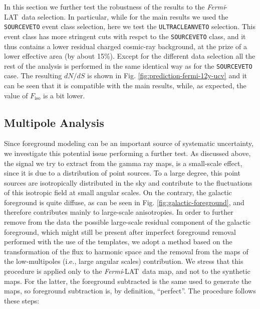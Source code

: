 \documentclass[a4paper,11pt]{article}
\newcommand{\fermi}{\textsl{Fermi}-LAT\ }
\newcommand{\fiso}{{F_\textrm{iso}}}
\newcommand{\dnds}{dN/dS }
\begin{document}
In this section we further test the robustness of the results to the \fermi data selection. In particular, while for the main results we used the \texttt{SOURCEVETO} event class selection, here we test the \texttt{ULTRACLEANVETO} selection. This event class has more stringent cuts with respct to the \texttt{SOURCEVETO} class, and it thus contains a lower residual charged  cosmic-ray background, at the prize of a lower effective area (by about 15\%). Except for the different data selection all the rest of the analysis is performed in the same identical way as for the \texttt{SOURCEVETO} case. The resulting $\dnds$ is shown in Fig. \ref{fig:prediction-fermi-12y-ucv} and it can be seen that it is compatible with the main results, while, as expected, the value of $\fiso$ is a bit lower. 



\subsection{Multipole Analysis}



Since foreground modeling can be an important source of systematic uncertainty,  we investigate this potential issue performing a further test. 
As discussed above, the signal we try to extract from the gamma ray maps, is a small-scale effect, since it is due to a distribution of point sources. To a large degree, this point sources are isotropically distributed in the sky and contribute to the fluctuations of this isotropic field at small angular scales. On the contrary, the galactic foreground is quite diffuse, as can be seen in Fig. \ref{fig:galactic-foreground}, and therefore contributes mainly to large-scale anisotropies. 
In order to further remove from the data the possible large-scale residual component of the galactic foreground, which might still be present after imperfect foreground removal performed with the use of the templates, we adopt a method based on the transformation of the flux to harmonic space and the removal from the maps of the low-multipoles (i.e., large angular scales) contribution. 
We stress that this procedure is applied only to the \fermi data map, and  not to the synthetic maps. For the latter, the foreground subtracted is the same used to generate the maps, so foreground subtraction is, by definition, ``perfect''. 
The procedure follows these steps:
\end{document}
